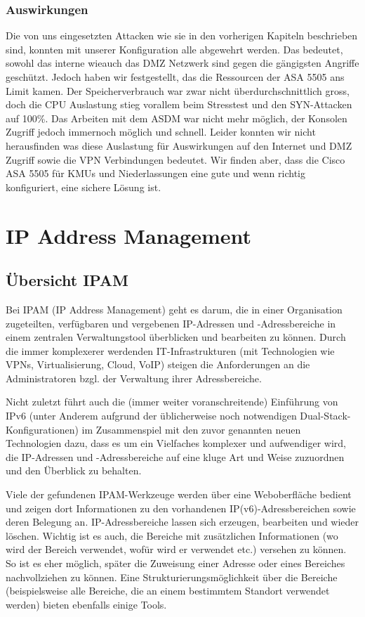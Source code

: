 \documentclass[11pt,a4paper,parskip=half]{scrartcl}
\begin{document}
\subsubsection{Auswirkungen}
Die von uns eingesetzten Attacken wie sie in den vorherigen Kapiteln beschrieben sind, konnten mit unserer Konfiguration alle abgewehrt werden. Das bedeutet, sowohl das interne wieauch das DMZ Netzwerk sind gegen die gängigsten Angriffe geschützt. Jedoch haben wir festgestellt, das die Ressourcen der ASA 5505 ans Limit kamen. Der Speicherverbrauch war zwar nicht überdurchschnittlich gross, doch die CPU Auslastung stieg vorallem beim Stresstest und den SYN-Attacken auf 100\%. Das Arbeiten mit dem ASDM war nicht mehr möglich, der Konsolen Zugriff jedoch immernoch möglich und schnell. Leider konnten wir nicht herausfinden was diese Auslastung für Auswirkungen auf den Internet und DMZ Zugriff sowie die VPN Verbindungen bedeutet. Wir finden aber, dass die Cisco ASA 5505 für KMUs und Niederlassungen eine gute und wenn richtig konfiguriert, eine sichere Lösung ist.

\newpage
\section{IP Address Management}
\subsection{Übersicht IPAM}
Bei IPAM (IP Address Management) geht es darum, die in einer Organisation zugeteilten, verfügbaren und vergebenen IP-Adressen und -Adressbereiche in einem zentralen Verwaltungstool überblicken und bearbeiten zu können. Durch die immer komplexerer werdenden IT-Infrastrukturen (mit Technologien wie VPNs, Virtualisierung, Cloud, VoIP) steigen die Anforderungen an die Administratoren bzgl. der Verwaltung \glqq{}ihrer\grqq{} Adressbereiche.

Nicht zuletzt führt auch die (immer weiter voranschreitende) Einführung von IPv6 (unter Anderem aufgrund der üblicherweise noch notwendigen Dual-Stack-Konfigurationen) im Zusammenspiel mit den zuvor genannten neuen Technologien dazu, dass es um ein Vielfaches komplexer und aufwendiger wird, die IP-Adressen und -Adressbereiche auf eine kluge Art und Weise zuzuordnen und den Überblick zu behalten.

Viele der gefundenen IPAM-Werkzeuge werden über eine Weboberfläche bedient und zeigen dort Informationen zu den vorhandenen IP(v6)-Adressbereichen sowie deren Belegung an. IP-Adressbereiche lassen sich erzeugen, bearbeiten und wieder löschen. Wichtig ist es auch, die Bereiche mit zusätzlichen Informationen (wo wird der Bereich verwendet, wofür wird er verwendet etc.) versehen zu können. So ist es eher möglich, später die Zuweisung einer Adresse oder eines Bereiches nachvollziehen zu können. Eine Strukturierungsmöglichkeit über die Bereiche (beispielsweise alle Bereiche, die an einem bestimmtem Standort verwendet werden) bieten ebenfalls einige Tools.
\end{document}

